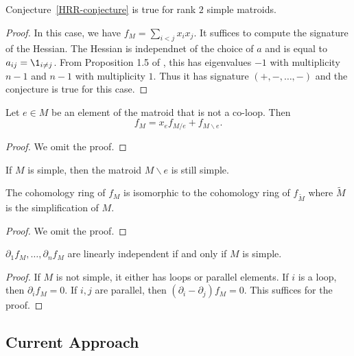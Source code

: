 \documentclass[12pt]{article}
\begin{document}
\begin{thm}
 	Conjecture~\ref{HRR-conjecture} is true for rank $2$ simple matroids. 
\end{thm}
\begin{proof}
	In this case, we have $f_M = \sum_{i < j} x_i x_j$. It suffices to compute the signature of the Hessian. The Hessian is independnet of the choice of $a$ and is equal to $a_{ij} = \1_{i \neq j}$. From Proposition 1.5 of \cite{Stanley-alg-combo}, this has eigenvalues $-1$ with multiplicity $n-1$ and $n-1$ with multiplicity $1$. Thus it has signature $(+, -, \ldots, -)$ and the conjecture is true for this case. 
\end{proof}
\begin{fact}
	Let $e \in M$ be an element of the matroid that is not a co-loop. Then 
	\[
		f_M = x_e f_{M / e} + f_{M \backslash e}.
	\]
\end{fact}
\begin{proof}
	We omit the proof. 
\end{proof}

If $M$ is simple, then the matroid $M \backslash e$ is still simple. 

\begin{fact}
	The cohomology ring of $f_M$ is isomorphic to the cohomology ring of $f_{\widetilde{M}}$ where $\widetilde{M}$ is the simplification of $M$. 
\end{fact}

\begin{proof}
	We omit the proof. 
\end{proof}


\begin{prop}
	$\partial_1 f_M, \ldots, \partial_n f_M$ are linearly independent if and only if $M$ is simple.  
\end{prop}
\begin{proof}
	If $M$ is not simple, it either has loops or parallel elements. If $i$ is a loop, then $\partial_i f_M = 0$. If $i, j$ are parallel, then $(\partial_i - \partial_j) f_M = 0$. This suffices for the proof. 
\end{proof}

\subsection{Current Approach}
\end{document}
